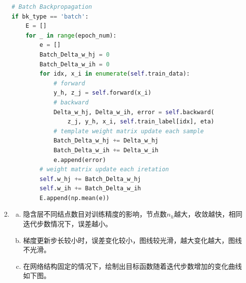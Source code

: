 \documentclass[a4paper,11pt,onecolumn,oneside,UTF8]{article}
\begin{document}
\begin{enumerate}
\begin{lstlisting}[language=Python]
# Batch Backpropagation
if bk_type == 'batch':
    E = []
    for _ in range(epoch_num):
        e = []
        Batch_Delta_w_hj = 0
        Batch_Delta_w_ih = 0
        for idx, x_i in enumerate(self.train_data):
            # forward
            y_h, z_j = self.forward(x_i)
            # backward
            Delta_w_hj, Delta_w_ih, error = self.backward(
                z_j, y_h, x_i, self.train_label[idx], eta)
            # template weight matrix update each sample
            Batch_Delta_w_hj += Delta_w_hj
            Batch_Delta_w_ih += Delta_w_ih
            e.append(error)
        # weight matrix update each iretation
        self.w_hj += Batch_Delta_w_hj
        self.w_ih += Batch_Delta_w_ih
        E.append(np.mean(e))
    \end{lstlisting}
    \item
          \begin{enumerate}[(a)]
              \item 隐含层不同结点数目对训练精度的影响，节点数$n_h$越大，收敛越快，相同迭代步数情况下，误差越小。
              \item 梯度更新步长较小时，误差变化较小，图线较光滑，越大变化越大，图线不光滑。
              \item 在网络结构固定的情况下，绘制出目标函数随着迭代步数增加的变化曲线如下图。
          \end{enumerate}
\end{enumerate}
\end{document}
